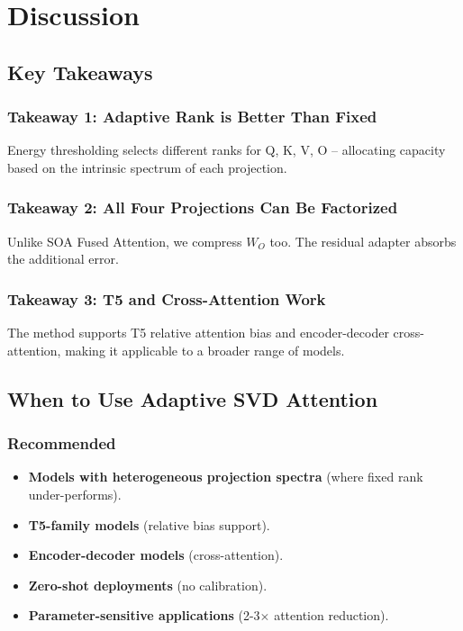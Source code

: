 \section{Discussion}

\subsection{Key Takeaways}

\subsubsection{Takeaway 1: Adaptive Rank is Better Than Fixed}

Energy thresholding selects different ranks for Q, K, V, O -- allocating 
capacity based on the intrinsic spectrum of each projection.

\subsubsection{Takeaway 2: All Four Projections Can Be Factorized}

Unlike SOA Fused Attention, we compress $W_O$ too. The residual adapter 
absorbs the additional error.

\subsubsection{Takeaway 3: T5 and Cross-Attention Work}

The method supports T5 relative attention bias and encoder-decoder cross-
attention, making it applicable to a broader range of models.

\subsection{When to Use Adaptive SVD Attention}

\subsubsection{Recommended}
\begin{itemize}
\item \textbf{Models with heterogeneous projection spectra} (where fixed rank
  under-performs).
\item \textbf{T5-family models} (relative bias support).
\item \textbf{Encoder-decoder models} (cross-attention).
\item \textbf{Zero-shot deployments} (no calibration).
\item \textbf{Parameter-sensitive applications} (2-3$\times$ attention reduction).

\end{itemize}
